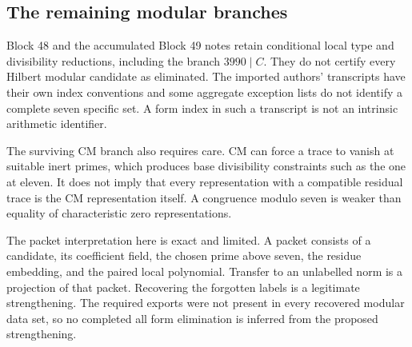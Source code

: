 \subsection{The remaining modular branches}
Block 48 and the accumulated Block 49 notes retain conditional local type and divisibility reductions, including the branch $3990\mid C$. They do not certify every Hilbert modular candidate as eliminated. The imported authors' transcripts have their own index conventions and some aggregate exception lists do not identify a complete seven specific set. A form index in such a transcript is not an intrinsic arithmetic identifier.

The surviving CM branch also requires care. CM can force a trace to vanish at suitable inert primes, which produces base divisibility constraints such as the one at eleven. It does not imply that every representation with a compatible residual trace is the CM representation itself. A congruence modulo seven is weaker than equality of characteristic zero representations.

The packet interpretation here is exact and limited. A packet consists of a candidate, its coefficient field, the chosen prime above seven, the residue embedding, and the paired local polynomial. Transfer to an unlabelled norm is a projection of that packet. Recovering the forgotten labels is a legitimate strengthening. The required exports were not present in every recovered modular data set, so no completed all form elimination is inferred from the proposed strengthening.
